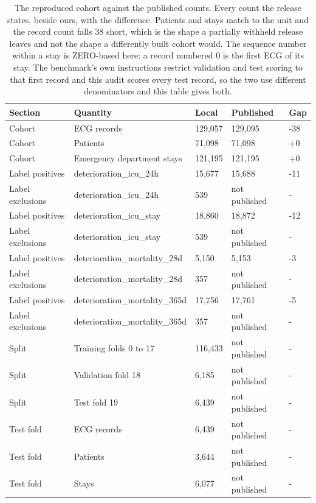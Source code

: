 \begin{table}[t]
\centering
\small
\caption{The reproduced cohort against the published counts. Every count the release states, beside ours, with the difference. Patients and stays match to the unit and the record count falls 38 short, which is the shape a partially withheld release leaves and not the shape a differently built cohort would. The sequence number within a stay is ZERO-based here: a record numbered 0 is the first ECG of its stay. The benchmark's own instructions restrict validation and test scoring to that first record and this audit scores every test record, so the two use different denominators and this table gives both.}
\label{tab:cohort_reconciliation}
\begin{tabular}{lllll}
\toprule
Section & Quantity & Local & Published & Gap \\
\midrule
Cohort & ECG records & 129,057 & 129,095 & -38 \\
Cohort & Patients & 71,098 & 71,098 & +0 \\
Cohort & Emergency department stays & 121,195 & 121,195 & +0 \\
Label positives & deterioration\_icu\_24h & 15,677 & 15,688 & -11 \\
Label exclusions & deterioration\_icu\_24h & 539 & not published & - \\
Label positives & deterioration\_icu\_stay & 18,860 & 18,872 & -12 \\
Label exclusions & deterioration\_icu\_stay & 539 & not published & - \\
Label positives & deterioration\_mortality\_28d & 5,150 & 5,153 & -3 \\
Label exclusions & deterioration\_mortality\_28d & 357 & not published & - \\
Label positives & deterioration\_mortality\_365d & 17,756 & 17,761 & -5 \\
Label exclusions & deterioration\_mortality\_365d & 357 & not published & - \\
Split & Training folds 0 to 17 & 116,433 & not published & - \\
Split & Validation fold 18 & 6,185 & not published & - \\
Split & Test fold 19 & 6,439 & not published & - \\
Test fold & ECG records & 6,439 & not published & - \\
Test fold & Patients & 3,644 & not published & - \\
Test fold & Stays & 6,077 & not published & - \\

\end{tabular}
\end{table}

